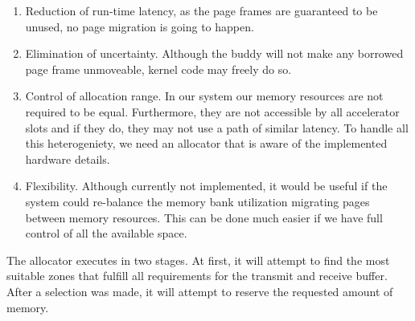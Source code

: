 \begin{enumerate}
\item	Reduction of run-time latency, as the page frames are guaranteed to be unused,
	no page migration is going to happen.
\item	Elimination of uncertainty. Although the \gls{buddy} will not make any
	borrowed page frame unmoveable, kernel code may freely do so.
\item	Control of allocation range. In our system our memory resources are not
	required to be equal. Furthermore, they are not accessible by all 
	accelerator slots and if they do, they may not use a path of similar latency.
	To handle all this heterogeniety, we need an allocator that is aware
	of the implemented hardware details.
\item	Flexibility. Although currently not implemented, it would be useful if
	the system could re-balance the memory bank utilization migrating pages
	between memory resources. This can be done much easier if we have full
	control of all the available space.
\end{enumerate}

The allocator executes in two stages. At first, it will attempt to find the most suitable zones that
fulfill all requirements for the transmit and receive buffer. After a selection was made, it will
attempt to reserve the requested amount of memory. 


